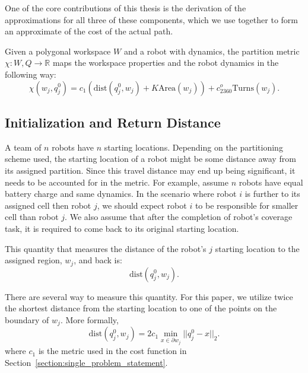 \documentclass[../main.tex]{subfiles}
\begin{document}
One of the core contributions of this thesis is the derivation of the approximations for all three of these components, which we use together to form an approximate of the cost of the actual path.


\begin{definition}
Given a polygonal workspace $W$ and a robot with dynamics, the partition metric $\chi:W,Q\to\mathbb{R}$ maps the workspace properties and the robot dynamics in the following way:
	\begin{equation}
		\chi(w_j,q_j^0)=c_1(\text{dist}(q^0_j,w_j)+K\text{Area}(w_j))+c_2360^o\text{Turns}(w_j).
	\end{equation}
\end{definition}


\subsection{Initialization and Return Distance}

A team of $n$ robots have $n$ starting locations. Depending on the partitioning scheme used, the starting location of a robot might be some distance away from its assigned partition. Since this travel distance may end up being significant, it needs to be accounted for in the metric. For example, assume $n$ robots have equal battery charge and same dynamics. In the scenario where robot $i$ is further to its assigned cell then robot $j$, we should expect robot $i$ to be responsible for smaller cell than robot $j$. We also assume that after the completion of robot's coverage task, it is required to come back to its original starting location.

This quantity that measures the distance of the robot's $j$ starting location to the assigned region, $w_j$, and back is:
\begin{equation}
	\text{dist}(q^0_j,w_j).
\end{equation}

There are several way to measure this quantity. For this paper, we utilize twice the shortest distance from the starting location to one of the points on the boundary of $w_j$. More formally, 
\begin{equation}
	\text{dist}(q^0_j,w_j)=2c_1\min_{x\in\partial w_j}||q^0_j-x||_2.
\end{equation}
where $c_1$ is the metric used in the cost function in Section~\ref{section:single_problem_statement}.
\end{document}

